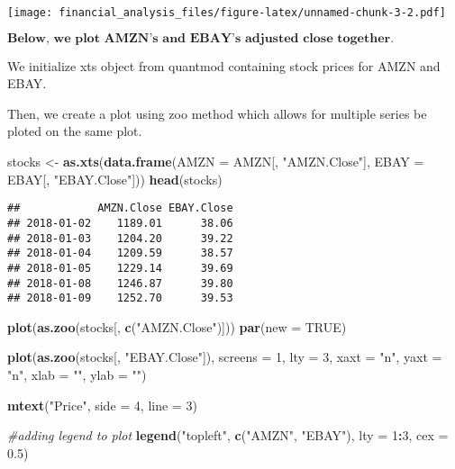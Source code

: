 \documentclass[]{article}
\newenvironment{Shaded}{\begin{snugshade}}{\end{snugshade}}
\newcommand{\KeywordTok}[1]{\textcolor[rgb]{0.13,0.29,0.53}{\textbf{#1}}}
\newcommand{\DataTypeTok}[1]{\textcolor[rgb]{0.13,0.29,0.53}{#1}}
\newcommand{\DecValTok}[1]{\textcolor[rgb]{0.00,0.00,0.81}{#1}}
\newcommand{\FloatTok}[1]{\textcolor[rgb]{0.00,0.00,0.81}{#1}}
\newcommand{\StringTok}[1]{\textcolor[rgb]{0.31,0.60,0.02}{#1}}
\newcommand{\CommentTok}[1]{\textcolor[rgb]{0.56,0.35,0.01}{\textit{#1}}}
\newcommand{\OtherTok}[1]{\textcolor[rgb]{0.56,0.35,0.01}{#1}}
\newcommand{\OperatorTok}[1]{\textcolor[rgb]{0.81,0.36,0.00}{\textbf{#1}}}
\newcommand{\NormalTok}[1]{#1}
\begin{document}
\texttt{[image: financial\_analysis\_files/figure-latex/unnamed-chunk-3-2.pdf]}

\(\textbf{Below, we plot AMZN's and EBAY's adjusted close together.}\)

We initialize xts object from quantmod containing stock prices for AMZN
and EBAY.

Then, we create a plot using zoo method which allows for multiple series
be ploted on the same plot.

\begin{Shaded}
\begin{Highlighting}[]
\NormalTok{stocks <-}\StringTok{ }\KeywordTok{as.xts}\NormalTok{(}\KeywordTok{data.frame}\NormalTok{(}\DataTypeTok{AMZN =}\NormalTok{ AMZN[, }\StringTok{"AMZN.Close"}\NormalTok{], }\DataTypeTok{EBAY =}\NormalTok{ EBAY[, }\StringTok{"EBAY.Close"}\NormalTok{]))}
\KeywordTok{head}\NormalTok{(stocks)}
\end{Highlighting}
\end{Shaded}

\begin{verbatim}
##            AMZN.Close EBAY.Close
## 2018-01-02    1189.01      38.06
## 2018-01-03    1204.20      39.22
## 2018-01-04    1209.59      38.57
## 2018-01-05    1229.14      39.69
## 2018-01-08    1246.87      39.80
## 2018-01-09    1252.70      39.53
\end{verbatim}

\begin{Shaded}
\begin{Highlighting}[]
\KeywordTok{plot}\NormalTok{(}\KeywordTok{as.zoo}\NormalTok{(stocks[, }\KeywordTok{c}\NormalTok{(}\StringTok{"AMZN.Close"}\NormalTok{)]))}
\KeywordTok{par}\NormalTok{(}\DataTypeTok{new =} \OtherTok{TRUE}\NormalTok{)}

\KeywordTok{plot}\NormalTok{(}\KeywordTok{as.zoo}\NormalTok{(stocks[, }\StringTok{"EBAY.Close"}\NormalTok{]), }\DataTypeTok{screens =} \DecValTok{1}\NormalTok{, }\DataTypeTok{lty =} \DecValTok{3}\NormalTok{, }\DataTypeTok{xaxt =} \StringTok{"n"}\NormalTok{, }\DataTypeTok{yaxt =} \StringTok{"n"}\NormalTok{, }
    \DataTypeTok{xlab =} \StringTok{""}\NormalTok{, }\DataTypeTok{ylab =} \StringTok{""}\NormalTok{)}

\KeywordTok{mtext}\NormalTok{(}\StringTok{"Price"}\NormalTok{, }\DataTypeTok{side =} \DecValTok{4}\NormalTok{, }\DataTypeTok{line =} \DecValTok{3}\NormalTok{)}

\CommentTok{#adding legend to plot}
\KeywordTok{legend}\NormalTok{(}\StringTok{"topleft"}\NormalTok{, }\KeywordTok{c}\NormalTok{(}\StringTok{"AMZN"}\NormalTok{, }\StringTok{"EBAY"}\NormalTok{), }\DataTypeTok{lty =} \DecValTok{1}\OperatorTok{:}\DecValTok{3}\NormalTok{, }\DataTypeTok{cex =} \FloatTok{0.5}\NormalTok{)}
\end{Highlighting}
\end{Shaded}
\end{document}
